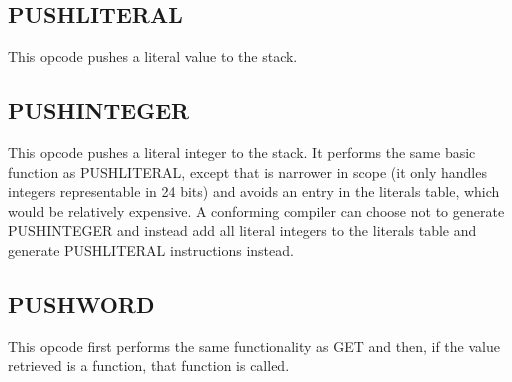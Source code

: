 \subsection{PUSH\textunderscore{}LITERAL}
This opcode pushes a literal value to the stack.

\subsection{PUSH\textunderscore{}INTEGER}
This opcode pushes a literal integer to the stack. It performs the same
basic function as PUSH\textunderscore{}LITERAL, except that is narrower
in scope (it only handles integers representable in 24 bits) and avoids
an entry in the literals table, which would be relatively expensive. A
conforming compiler can choose not to generate PUSH\textunderscore{}INTEGER
and instead add all literal integers to the literals table and generate
PUSH\textunderscore{}LITERAL instructions instead.

\subsection{PUSH\textunderscore{}WORD}
This opcode first performs the same functionality as GET and then, if
the value retrieved is a function, that function is called.
